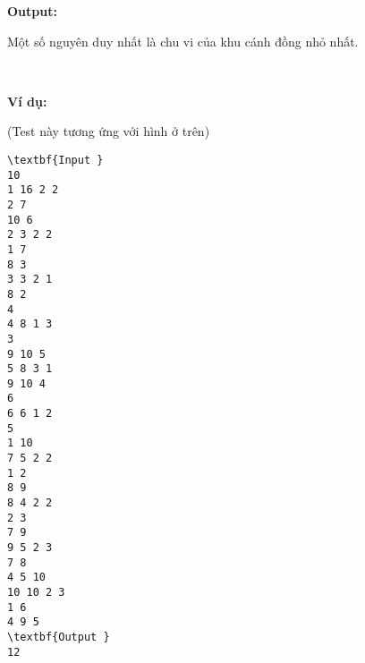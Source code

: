 \textbf{Output: }\textbf{}

Một số nguyên duy nhất là chu vi của khu cánh đồng nhỏ nhất.

 

\textbf{Ví dụ: }

(Test này tương ứng với hình ở trên) \textbf{}
\begin{verbatim}
\textbf{Input }
10
1 16 2 2
2 7
10 6
2 3 2 2
1 7
8 3
3 3 2 1
8 2
4
4 8 1 3
3
9 10 5
5 8 3 1
9 10 4
6
6 6 1 2
5
1 10
7 5 2 2
1 2
8 9
8 4 2 2
2 3
7 9
9 5 2 3
7 8
4 5 10
10 10 2 3
1 6
4 9 5
\textbf{Output }
12\end{verbatim}
